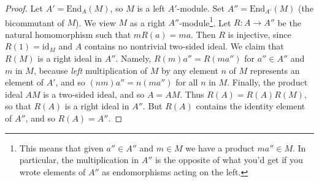 \documentclass[10pt,a4paper]{amsart}
\theoremstyle{plain}
\theoremstyle{definition}
\theoremstyle{remark}
\numberwithin{equation}{subsection}
\begin{document}
\begin{proof}
Let $A' = \text{End}_A(M)$, so $M$ is a left $A'$-module.
Set $A'' = \text{End}_{A'}(M)$ (the bicommutant of $M$).
We view $M$ as a right $A''$-module\footnote{This
means that given $a'' \in A''$ and $m \in M$ we have a product
$m a'' \in M$. In particular, the multiplication in $A''$
is the opposite of what you'd get if you wrote elements of $A''$
as endomorphisms acting on the left.}.
Let $R : A \to A''$ be the natural homomorphism such that
$mR(a) = ma$. Then $R$ is injective, since $R(1) = \text{id}_M$
and $A$ contains no nontrivial two-sided ideal. We claim that $R(M)$
is a right ideal in $A''$. Namely, $R(m)a'' = R(ma'')$ for $a'' \in A''$
and $m$ in $M$, because {\it left} multiplication of $M$ by any element $n$
of $M$ represents an element of $A'$, and so
$(nm)a'' = n(ma'')$ for all $n$ in $M$.
Finally, the product ideal $AM$ is a two-sided ideal, and so
$A = AM$. Thus $R(A) = R(A)R(M)$, so that $R(A)$ is a right ideal in $A''$.
But $R(A)$ contains the identity element of $A''$, and so $R(A) = A''$.
\end{proof}
\end{document}
